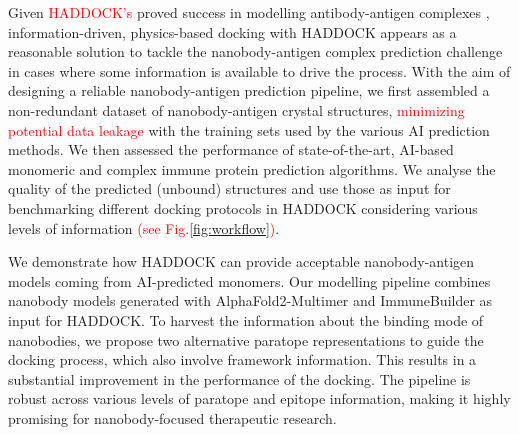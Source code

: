 \documentclass[12pt]{article}
\begin{document}
Given \textcolor{Red}{HADDOCK's} proved success in modelling antibody-antigen complexes \cite{ambrosetti2020modeling, giulini2024towards}, information-driven, physics-based docking with HADDOCK \cite{dominguez2003haddock} appears as a reasonable solution to tackle the nanobody-antigen complex prediction challenge in cases where some information is available to drive the process. With the aim of designing a reliable nanobody-antigen prediction pipeline, we first assembled a non-redundant dataset of nanobody-antigen crystal structures, \textcolor{Red}{minimizing potential data leakage} with the training sets used by the various AI prediction methods. We then assessed the performance of state-of-the-art, AI-based monomeric and complex immune protein prediction algorithms. We analyse the quality of the predicted (unbound) structures and use those as input for benchmarking different docking protocols in HADDOCK considering various levels of information \textcolor{Red}{(see Fig.\ref{fig:workflow})}.

We demonstrate how HADDOCK can provide acceptable nanobody-antigen models coming from AI-predicted monomers. Our modelling pipeline combines nanobody models generated with AlphaFold2-Multimer and ImmuneBuilder as input for HADDOCK. To harvest the information about the binding mode of nanobodies, we propose two alternative paratope representations to guide the docking process, which also involve framework information. This results in a substantial improvement in the performance of the docking. The pipeline is robust across various levels of paratope and epitope information, making it highly promising for nanobody-focused therapeutic research.
\end{document}

